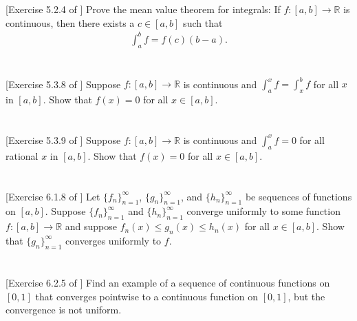\documentclass[11pt,letterpaper]{article}
\begin{document}
\section{} [Exercise 5.2.4 of \cite{Lebl_23}] 
Prove the mean value theorem for integrals: If $f:[a,b]\to\mathbb{R}$ is continuous, then there exists a $c\in[a,b]$ such that
\begin{align}
    \int^b_a f = f(c)(b-a).
\end{align}

\section{} [Exercise 5.3.8 of \cite{Lebl_23}] 
Suppose $f:[a,b]\to\mathbb{R}$ is continuous and
$\int^x_a f = \int^b_x f$ for all $x$ in $[a,b]$. Show that
$f(x)=0$ for all $x\in[a,b]$.

\section{} [Exercise 5.3.9 of \cite{Lebl_23}] 
Suppose $f:[a,b]\to\mathbb{R}$ is continuous and
$\int^x_a f = 0$ for all rational $x$ in $[a,b]$. Show that
$f(x)=0$ for all $x\in[a,b]$.

\section{} [Exercise 6.1.8 of \cite{Lebl_23}] 
Let $\{f_n\}_{n=1}^\infty$, $\{g_n\}_{n=1}^\infty$, and $\{h_n\}_{n=1}^\infty$ be sequences of functions on $[a,b]$. Suppose $\{f_n\}_{n=1}^\infty$ and $\{h_n\}_{n=1}^\infty$ converge uniformly to some function $f:[a,b]\to\mathbb{R}$ and suppose $f_n(x)\leq g_n(x) \leq h_n(x)$ for all $x\in[a,b]$. Show that $\{g_n\}_{n=1}^\infty$ converges uniformly to $f$.

\section{} [Exercise 6.2.5 of \cite{Lebl_23}] 
Find an example of a sequence of continuous functions on $[0, 1]$ that converges pointwise to a
continuous function on $[0, 1]$, but the convergence is not uniform.

\vfill
\printbibliography
\end{document}
